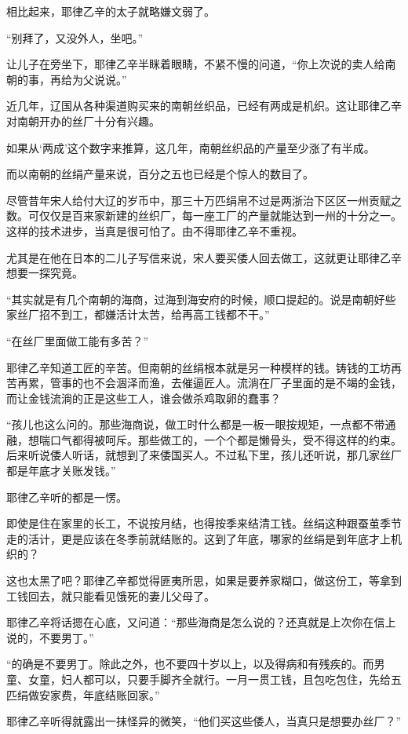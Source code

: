 相比起来，耶律乙辛的太子就略嫌文弱了。

“别拜了，又没外人，坐吧。”

让儿子在旁坐下，耶律乙辛半眯着眼睛，不紧不慢的问道，“你上次说的卖人给南朝的事，再给为父说说。”

近几年，辽国从各种渠道购买来的南朝丝织品，已经有两成是机织。这让耶律乙辛对南朝开办的丝厂十分有兴趣。

如果从‘两成’这个数字来推算，这几年，南朝丝织品的产量至少涨了有半成。

而以南朝的丝绢产量来说，百分之五也已经是个惊人的数目了。

尽管昔年宋人给付大辽的岁币中，那三十万匹绢帛不过是两浙治下区区一州贡赋之数。可仅仅是百来家新建的丝织厂，每一座工厂的产量就能达到一州的十分之一。这样的技术进步，当真是很可怕了。由不得耶律乙辛不重视。

尤其是在他在日本的二儿子写信来说，宋人要买倭人回去做工，这就更让耶律乙辛想要一探究竟。

“其实就是有几个南朝的海商，过海到海安府的时候，顺口提起的。说是南朝好些家丝厂招不到工，都嫌活计太苦，给再高工钱都不干。”

“在丝厂里面做工能有多苦？”

耶律乙辛知道工匠的辛苦。但南朝的丝绢根本就是另一种模样的钱。铸钱的工坊再苦再累，管事的也不会涸泽而渔，去催逼匠人。流淌在厂子里面的是不竭的金钱，而让金钱流淌的正是这些工人，谁会做杀鸡取卵的蠢事？

“孩儿也这么问的。那些海商说，做工时什么都是一板一眼按规矩，一点都不带通融，想喘口气都得被呵斥。那些做工的，一个个都是懒骨头，受不得这样的约束。后来听说倭人听话，就想到了来倭国买人。不过私下里，孩儿还听说，那几家丝厂都是年底才关账发钱。”

耶律乙辛听的都是一愣。

即使是住在家里的长工，不说按月结，也得按季来结清工钱。丝绢这种跟蚕茧季节走的活计，更是应该在冬季前就结账的。这到了年底，哪家的丝绢是到年底才上机织的？

这也太黑了吧？耶律乙辛都觉得匪夷所思，如果是要养家糊口，做这份工，等拿到工钱回去，就只能看见饿死的妻儿父母了。

耶律乙辛将话摁在心底，又问道：“那些海商是怎么说的？还真就是上次你在信上说的，不要男丁。”

“的确是不要男丁。除此之外，也不要四十岁以上，以及得病和有残疾的。而男童、女童，妇人都可以，只要手脚齐全就行。一月一贯工钱，且包吃包住，先给五匹绢做安家费，年底结账回家。”

耶律乙辛听得就露出一抹怪异的微笑，“他们买这些倭人，当真只是想要办丝厂？”

